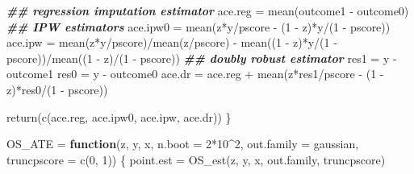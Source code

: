\documentclass[
]{article}
\newenvironment{Shaded}{\begin{snugshade}}{\end{snugshade}}
\newcommand{\AttributeTok}[1]{\textcolor[rgb]{0.77,0.63,0.00}{#1}}
\newcommand{\ControlFlowTok}[1]{\textcolor[rgb]{0.13,0.29,0.53}{\textbf{#1}}}
\newcommand{\DecValTok}[1]{\textcolor[rgb]{0.00,0.00,0.81}{#1}}
\newcommand{\DocumentationTok}[1]{\textcolor[rgb]{0.56,0.35,0.01}{\textbf{\textit{#1}}}}
\newcommand{\FunctionTok}[1]{\textcolor[rgb]{0.00,0.00,0.00}{#1}}
\newcommand{\NormalTok}[1]{#1}
\newcommand{\OtherTok}[1]{\textcolor[rgb]{0.56,0.35,0.01}{#1}}
\newcommand{\SpecialCharTok}[1]{\textcolor[rgb]{0.00,0.00,0.00}{#1}}
\begin{document}
\begin{Shaded}
\begin{Highlighting}[]
     \DocumentationTok{\#\# regression imputation estimator}
\NormalTok{     ace.reg  }\OtherTok{=} \FunctionTok{mean}\NormalTok{(outcome1 }\SpecialCharTok{{-}}\NormalTok{ outcome0) }
     \DocumentationTok{\#\# IPW estimators}
\NormalTok{     ace.ipw0 }\OtherTok{=} \FunctionTok{mean}\NormalTok{(z}\SpecialCharTok{*}\NormalTok{y}\SpecialCharTok{/}\NormalTok{pscore }\SpecialCharTok{{-}}\NormalTok{ (}\DecValTok{1} \SpecialCharTok{{-}}\NormalTok{ z)}\SpecialCharTok{*}\NormalTok{y}\SpecialCharTok{/}\NormalTok{(}\DecValTok{1} \SpecialCharTok{{-}}\NormalTok{ pscore))}
\NormalTok{     ace.ipw  }\OtherTok{=} \FunctionTok{mean}\NormalTok{(z}\SpecialCharTok{*}\NormalTok{y}\SpecialCharTok{/}\NormalTok{pscore)}\SpecialCharTok{/}\FunctionTok{mean}\NormalTok{(z}\SpecialCharTok{/}\NormalTok{pscore) }\SpecialCharTok{{-}} 
                   \FunctionTok{mean}\NormalTok{((}\DecValTok{1} \SpecialCharTok{{-}}\NormalTok{ z)}\SpecialCharTok{*}\NormalTok{y}\SpecialCharTok{/}\NormalTok{(}\DecValTok{1} \SpecialCharTok{{-}}\NormalTok{ pscore))}\SpecialCharTok{/}\FunctionTok{mean}\NormalTok{((}\DecValTok{1} \SpecialCharTok{{-}}\NormalTok{ z)}\SpecialCharTok{/}\NormalTok{(}\DecValTok{1} \SpecialCharTok{{-}}\NormalTok{ pscore))}
     \DocumentationTok{\#\# doubly robust estimator}
\NormalTok{     res1     }\OtherTok{=}\NormalTok{ y }\SpecialCharTok{{-}}\NormalTok{ outcome1}
\NormalTok{     res0     }\OtherTok{=}\NormalTok{ y }\SpecialCharTok{{-}}\NormalTok{ outcome0}
\NormalTok{     ace.dr   }\OtherTok{=}\NormalTok{ ace.reg }\SpecialCharTok{+} \FunctionTok{mean}\NormalTok{(z}\SpecialCharTok{*}\NormalTok{res1}\SpecialCharTok{/}\NormalTok{pscore }\SpecialCharTok{{-}}\NormalTok{ (}\DecValTok{1} \SpecialCharTok{{-}}\NormalTok{ z)}\SpecialCharTok{*}\NormalTok{res0}\SpecialCharTok{/}\NormalTok{(}\DecValTok{1} \SpecialCharTok{{-}}\NormalTok{ pscore))}

     \FunctionTok{return}\NormalTok{(}\FunctionTok{c}\NormalTok{(ace.reg, ace.ipw0, ace.ipw, ace.dr))     }
\NormalTok{\}}


\NormalTok{OS\_ATE }\OtherTok{=} \ControlFlowTok{function}\NormalTok{(z, y, x, }\AttributeTok{n.boot =} \DecValTok{2}\SpecialCharTok{*}\DecValTok{10}\SpecialCharTok{\^{}}\DecValTok{2}\NormalTok{,}
                     \AttributeTok{out.family =}\NormalTok{ gaussian, }\AttributeTok{truncpscore =} \FunctionTok{c}\NormalTok{(}\DecValTok{0}\NormalTok{, }\DecValTok{1}\NormalTok{))}
\NormalTok{\{}
\NormalTok{     point.est  }\OtherTok{=} \FunctionTok{OS\_est}\NormalTok{(z, y, x, out.family, truncpscore)}
     

\end{Highlighting}
\end{Shaded}
\end{document}
